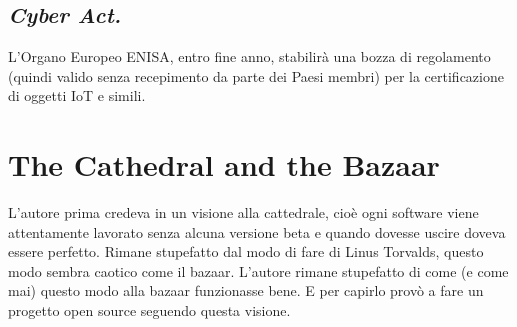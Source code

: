 \documentclass[a4page, 11pt, twocolumn]{article}
\begin{document}
\subsection{\textit{Cyber Act.}}
L'Organo Europeo ENISA, entro fine anno, stabilirà una bozza di regolamento (quindi valido senza recepimento da parte dei Paesi membri) per la certificazione di oggetti IoT e simili.

\section{The Cathedral and the Bazaar}
L'autore prima credeva in un visione alla cattedrale, cioè ogni software
viene attentamente lavorato senza alcuna versione beta e quando dovesse
uscire doveva essere perfetto. Rimane stupefatto dal modo di fare di
Linus Torvalds, questo modo sembra caotico come il bazaar. L'autore
rimane stupefatto di come (e come mai) questo modo alla bazaar
funzionasse bene. E per capirlo provò a fare un progetto open source
seguendo questa visione.
\end{document}

